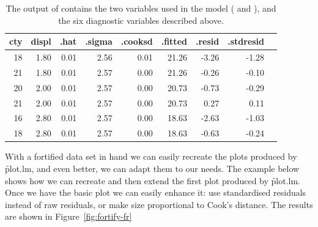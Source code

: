 {%

\begin{table}[ht]
  \centering
  \begin{tabular}{rrrrrrrrr}
    \toprule
    cty & displ & .hat & .sigma & .cooksd & .fitted & .resid & .stdresid \\
    \midrule
    18 & 1.80 & 0.01 & 2.56 & 0.01 & 21.26 & -3.26 & -1.28 \\
    21 & 1.80 & 0.01 & 2.57 & 0.00 & 21.26 & -0.26 & -0.10 \\
    20 & 2.00 & 0.01 & 2.57 & 0.00 & 20.73 & -0.73 & -0.29 \\
    21 & 2.00 & 0.01 & 2.57 & 0.00 & 20.73 & 0.27 & 0.11 \\
    16 & 2.80 & 0.01 & 2.57 & 0.00 & 18.63 & -2.63 & -1.03 \\
    18 & 2.80 & 0.01 & 2.57 & 0.00 & 18.63 & -0.63 & -0.24 \\
    \bottomrule
  \end{tabular}
  \caption{The output of  contains the two variables used in the model ( and ), and the six diagnostic variables described above.}
  \label{tbl:fortify-out}
\end{table}


With a fortified data set in hand we can easily recreate the plots produced by \f{plot.lm}, and even better, we can adapt them to our needs.  The example below shows how we can recreate and then extend the first plot produced by \f{plot.lm}.  Once we have the basic plot we can easily enhance it: use standardised residuals instead of raw residuals, or make size proportional to Cook's distance.  The results are shown in Figure~\ref{fig:fortify-fr}

% 


}
